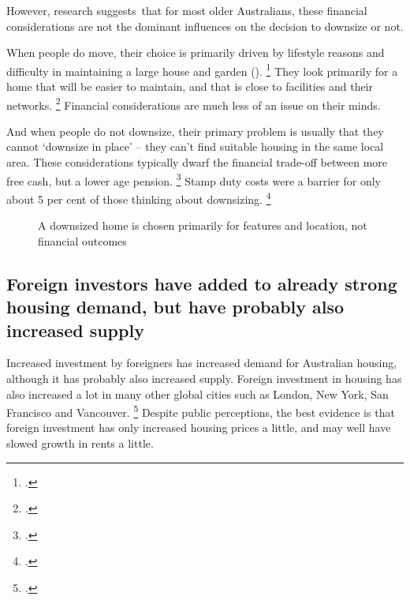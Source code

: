 However, research suggests~that for most older Australians, these financial considerations are not the dominant influences on the decision to downsize or not.

When people do move, their choice is primarily driven by lifestyle reasons and difficulty in maintaining a large house and garden ().%
    \footcites[][40]{PC-2015-Housing-decisions-elderly}[][81--82, 138]{JuddEtAlDownsizing2014}[][15]{Daley-2017-AAA-Housing-for-older-Australians-COTA-prez}
They look primarily for a home that will be easier to maintain, and that is close to facilities and their networks.
    \footcite[][95]{JuddEtAlDownsizing2014}
Financial considerations are much less of an issue on their minds.

And when people do not downsize, their primary problem is usually that they cannot `downsize in place' -- they can't find suitable housing in the same local area.
These considerations typically dwarf the financial trade-off between more free cash, but a lower age pension.%
	\footcite[][7]{PC-2015-Housing-decisions-elderly}
Stamp duty costs were a barrier for only about 5 per cent of those thinking about downsizing.%
    \footcite[][40]{PC-2015-Housing-decisions-elderly}
\begin{figure}
\caption{A downsized home is chosen primarily for features and location, not financial outcomes}\label{fig:motives-for-downsizing}
\end{figure}

\subsection{Foreign investors have added to already strong housing demand, but have probably also increased supply}\label{subsec:foreign-investors-have-added-to-already-strong-housing-demand-but-have-also-increased-supply}

Increased investment by foreigners has increased demand for Australian housing, although it has probably also increased supply. Foreign investment in housing has also increased a lot in many other global cities such as London, New York, San Francisco and Vancouver.%
    \footcites{Surowiecki2014realestate}{UBSglobalrealestate}{Rogers_2016_foreign_investment_broken_supply}
Despite public perceptions, the best evidence is that foreign investment has only increased housing prices a little, and may well have slowed growth in rents a little.

